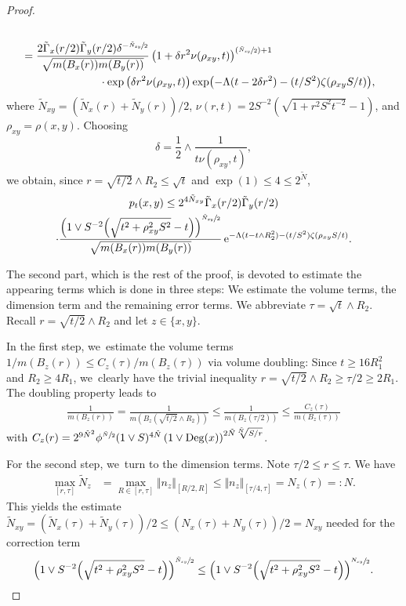 \documentclass[10pt]{amsart}
\newcommand{\Psfrac}[2]{(\sfrac{#1}{#2})}
\theoremstyle{plain}
\theoremstyle{definition}
\newcommand{\euler}{\mathrm{e}}
\DeclareMathOperator{\Deg}{Deg}
\begin{document}
\begin{proof}
\begin{align*}
\\
&
=
\frac{2
\tilde\Gamma_{x} (r/2)\tilde\Gamma_{y}(r/2)\delta^{-\sfrac{\tilde N_{xy}}{2}}}
{\sqrt{m(B_{x}(r))m(B_{y}(r))}} \left(1+\delta r^2\nu(\rho_{xy},t)\right)^{\Psfrac{\tilde N_{xy}}{2}+1}
\\
&\hspace*{2.5cm}\cdot
\exp\left(\delta r^2\nu(\rho_{xy},t)\right)
\exp\bigl(-\Lambda (t-2\delta r^2)-(t/S^2)\zeta(\rho_{xy}S/t)\bigr),
\end{align*}
where $\tilde N_{xy}=(\tilde N_x(r)+\tilde N_y(r))/2$, $\nu(r,t)=2 S^{-2}\left(\sqrt{1+{r^2S^2}{t^{-2}}}-1\right) $, and $\rho_{xy}=\rho(x,y)$. Choosing
\[
\delta=\frac{1}{2}\wedge \frac{1}{t\nu(\rho_{xy},t)},
\]
we obtain, since $r=\sqrt{t/2}\wedge R_2\leq \sqrt t$ and $ \exp(1)\leq 4 \leq 2^{\tilde N} $,
\begin{multline*}
p_{t}(x,y)
\leq 2^{4{\tilde N_{xy}}}
\tilde \Gamma_x(r/2)\tilde \Gamma_y(r/2)
\\
\cdot \frac{
\left(1\vee {S^{-2}}{\left(\sqrt{t^2+\rho_{xy}^2S^2}-t\right)}\right)^{\sfrac{\tilde N_{xy}}{2}}}
{\sqrt{m(B_{x}(r))m(B_{y}(r))}}\,
\euler^{-\Lambda (t-t\wedge R_2^2)-(t/S^2)\zeta(\rho_{xy}S/t)}.
\end{multline*}

The second part, which is the rest of the proof, is devoted to estimate the appearing terms which is done in three steps: We estimate the volume terms, the dimension term and the remaining error terms.
We abbreviate $\tau=\sqrt t\wedge R_2$. Recall $ r=\sqrt{t/2}\wedge R_2 $ and let $ z\in \{x,y\} $.

In the first step, we~estimate the volume terms $1/ m(B_{z}(r))\leq C_{z}(\tau)/m(B_{z}(\tau)) $ via volume doubling:
Since $ t\geq 16R_1^2$ and $ R_{2}\ge 4R_{1} $, we~clearly have the trivial inequality $r= \sqrt{t/2} \wedge R_2\geq \tau/2\geq 2R_1$. The doubling property leads to
\begin{align*}
\frac{1}{m(B_{z}(r))}
=
\frac{1}{m(B_{z}(\sqrt {t/2}\wedge R_2))}
\leq
\frac{1}{m(B_{z}(\tau/2))}
\leq
\frac{C_z(\tau)}{m(B_{z}(\tau))}
\end{align*}
with
{$ C_z(r)=2^{9 \tilde N^2}\phi^{\sfrac{\tilde N}{2}}(1\vee S)^{4\tilde N}\left(1\vee\Deg(x)\right)^{2\tilde N\sqrt[\tilde N]{S/r}} $.}

For the second step, we~turn to the dimension terms. Note $\tau/2\leq r\leq \tau$. We have
\begin{align*}
\max_{[r,\tau]}\tilde N_{z}&= \max_{R\in [r,\tau]}\Vert n_z\Vert_{[R/2,R] }\leq \Vert n_z\Vert_{[\tau/4,\tau] }= N_{z}(\tau)=:N.
\end{align*}
This yields the estimate $ \tilde N_{xy}=(\tilde N_{x}(\tau)+\tilde N_{y}(\tau))/2 \leq( N_{x}(\tau)+ N_{y}(\tau))/2=N_{xy} $ needed for the correction term
\begin{align*}
\left(1\vee {S^{-2}}{\left(\sqrt{t^2+\rho_{xy}^2S^2}-t\right)}\right)^{\sfrac{\tilde N_{xy}}{2}}\leq \Bigl(1\vee {S^{-2}}{\left(\sqrt{t^2+\rho_{xy}^2S^2}-t\right)}\Bigr)^{\sfrac{N_{xy}}{2}}.
\end{align*}


\end{proof}
\end{document}
